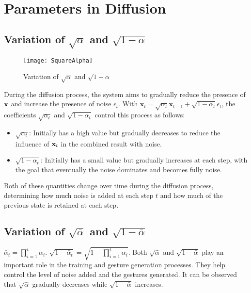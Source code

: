 \appendix
\renewcommand{\chaptername}{Appendix}
\chapter{Parameters in Diffusion}
\label{appendix:Appendix1}

\section{Variation of $\sqrt{\alpha}$ and $\sqrt{1 - \alpha}$}

\begin{figure}[H]
	\texttt{[image: SquareAlpha]}
	\label{fig:wrapfig}
	\caption{Variation of $\sqrt{\alpha}$ and $\sqrt{1 - \alpha}$}
\end{figure}

During the diffusion process, the system aims to gradually reduce the presence of $\mathbf{x}$ and increase the presence of noise $\epsilon_t$. With $\mathbf{x}_{t} = \sqrt{\alpha_t} \mathbf{x}_{t-1} + \sqrt{1 - \alpha_t} \epsilon_t$, the coefficients $\sqrt{\alpha_t}$ and $\sqrt{1 - \alpha_t}$ control this process as follows:

\begin{itemize}
	\item $\sqrt{\alpha_t}$: Initially has a high value but gradually decreases to reduce the influence of $\mathbf{x}_t$ in the combined result with noise.
	\item $\sqrt{1 - \alpha_t}$: Initially has a small value but gradually increases at each step, with the goal that eventually the noise dominates and becomes fully noise.
\end{itemize}

Both of these quantities change over time during the diffusion process, determining how much noise is added at each step $t$ and how much of the previous state is retained at each step.

\section{Variation of $\sqrt{\bar{\alpha}}$ and $\sqrt{1 - \bar{\alpha}}$}

$\bar{\alpha}_t = \prod_{i=1}^t \alpha_i$.  $\sqrt{1 - \bar{\alpha}_t} = \sqrt{1 - \prod_{i=1}^t \alpha_i}$. Both $\sqrt{\bar{\alpha}}$ and $\sqrt{1 - \bar{\alpha}}$ play an important role in the training and gesture generation processes. They help control the level of noise added and the gestures generated. It can be observed that $\sqrt{\bar{\alpha}}$ gradually decreases while $\sqrt{1 - \bar{\alpha}}$ increases.

